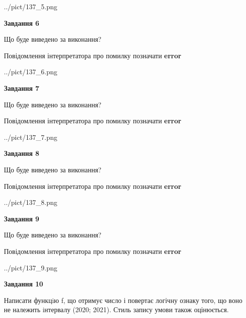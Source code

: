 \documentclass[12pt, ukrainian]{article}
\begin{document}
{\begin {large}
\begin{center}
	{../pict/137_5.png}
\end{center}
\newpage

{\begin {center}\textbf{Завдання 6}\end {center}}\par
Що буде виведено за виконання? \par
Повідомлення інтерпретатора про помилку позначати \textbf{error}

\begin{center}
	{../pict/137_6.png}
\end{center}
\newpage

{\begin {center}\textbf{Завдання 7}\end {center}}\par
Що буде виведено за виконання? \par
Повідомлення інтерпретатора про помилку позначати \textbf{error}

\begin{center}
	{../pict/137_7.png}
\end{center}
\newpage

{\begin {center}\textbf{Завдання 8}\end {center}}\par
Що буде виведено за виконання? \par
Повідомлення інтерпретатора про помилку позначати \textbf{error}

\begin{center}
	{../pict/137_8.png}
\end{center}
\newpage

{\begin {center}\textbf{Завдання 9}\end {center}}\par
Що буде виведено за виконання? \par
Повідомлення інтерпретатора про помилку позначати \textbf{error}

\begin{center}
	{../pict/137_9.png}
\end{center}
\newpage

{\begin {center}\textbf{Завдання 10}\end {center}}\par

Написати функцiю f, що отримує число і повертає логічну ознаку того, що воно не належить iнтервалу (2020; 2021). Стиль запису умови також оцінюється.\par
\newpage

\end {large}}
\end{document}
